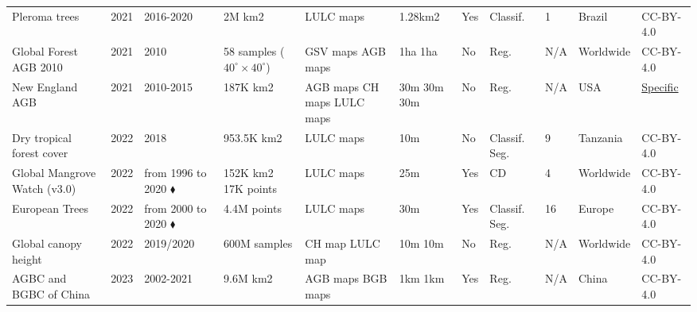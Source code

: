 \documentclass{CUP-JNL-DTM}%
\theoremstyle{definition}
\numberwithin{equation}{section}
\begin{document}
\begin{table*}[ht]
{\begin{fntable}
\begin{tabular}{p{1.5cm} | p{0.4cm} | p{1cm} | p{1.3cm} | p{1.2cm} : p{1cm} | p{0.4cm} | p{0.7cm} | p{0.8cm} | p{1cm} | p{1.1cm}}
Pleroma trees \cite{wagner_flowering_2021} & 2021 & 2016-2020 & 2M km2 & LULC maps & 1.28km2 & Yes & Classif. & 1 & Brazil & CC-BY-4.0 \\

Global Forest AGB 2010 \cite{santoro_global_2021} & 2021 & 2010 & 58 samples \newline ($40^{\circ} \times 40^{\circ}$) & GSV maps \newline AGB maps & 1ha \newline 1ha & No & Reg. & N/A & Worldwide & CC-BY-4.0 \\

New England AGB	\cite{tang_high-resolution_2021, ma_high-resolution_2021} & 2021 & 2010-2015 & 187K km2 & AGB maps \newline CH maps \newline LULC maps & 30m \newline 30m \newline 30m & No & Reg. & N/A & USA & \href{https://www.earthdata.nasa.gov/learn/use-data/data-use-policy?}{Specific} \\

Dry tropical forest cover \cite{verhegghen_mapping_2022} & 2022 & 2018 & 953.5K km2 & LULC maps & 10m & No & Classif. \newline Seg. & 9 & Tanzania & CC-BY-4.0 \\

Global Mangrove Watch (v3.0) \cite{bunting_global_2022} & 2022 & from 1996 to 2020 $\blacklozenge$ & 152K km2 \newline 17K points  & LULC maps & 25m & Yes & CD & 4 & Worldwide & CC-BY-4.0 \\

European Trees \cite{bonannella_forest_2022} & 2022 & from 2000 to 2020 $\blacklozenge$  & 4.4M points & LULC maps & 30m & Yes & Classif. \newline Seg. & 16 & Europe & CC-BY-4.0 \\

Global canopy height \cite{lang_high-resolution_2022, lang_global_2022} & 2022 & 2019/2020 & 600M samples & CH map \newline LULC map & 10m \newline 10m & No & Reg. & N/A & Worldwide & CC-BY-4.0 \\

AGBC and BGBC of China \cite{chen_maps_2023} & 2023 & 2002-2021 & 9.6M km2 & AGB maps \newline BGB maps & 1km \newline 1km & Yes & Reg. & N/A & China & CC-BY-4.0 \\


\end{tabular}
\end{fntable}}
\end{table*}
\end{document}
